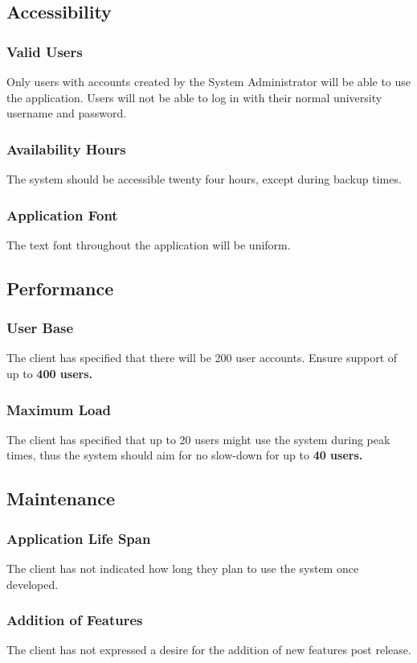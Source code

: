 \documentclass{article}
\begin{document}
\subsection{Accessibility}
\subsubsection{Valid Users}
Only users with accounts created by the System Administrator will be able to use
the application. Users will not be able to log in with their normal
university username and password.
\subsubsection{Availability Hours}
The system should be accessible twenty four hours, except during backup times.
\subsubsection{Application Font}
The text font throughout the application will be uniform.
\subsection{Performance}
\subsubsection{User Base}
The client has specified that there will be 200 user accounts. Ensure
support of up to \textbf{400 users.}
\subsubsection{Maximum Load}
The client has specified that up to 20 users might use the system during
peak times, thus the system should aim for no slow-down for up to \textbf{40 users.}
\subsection{Maintenance}
\subsubsection{Application Life Span}
The client has not indicated how long they plan to use the system once developed.
\subsubsection{Addition of Features}
The client has not expressed a desire for the addition of new
features post release.
\end{document}

